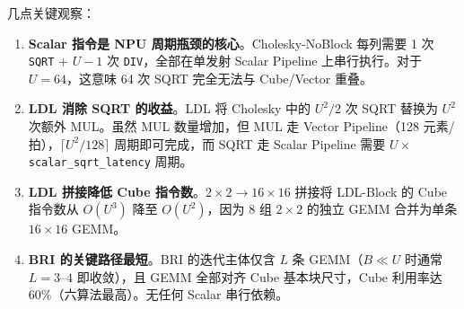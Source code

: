 \documentclass{CjC}
\begin{document}
    几点关键观察：

    \begin{enumerate}
        \item \textbf{Scalar 指令是 NPU 周期瓶颈的核心}。Cholesky-NoBlock 每列需要
            1 次 \texttt{SQRT} + $U-1$ 次 \texttt{DIV}，全部在单发射 Scalar
            Pipeline 上串行执行。对于 $U=64$，这意味 64 次 SQRT 完全无法与 Cube/Vector
            重叠。

        \item \textbf{LDL 消除 SQRT 的收益}。LDL 将 Cholesky 中的 $U^{2}/2$ 次 SQRT
            替换为 $U^{2}$ 次额外 MUL。虽然 MUL 数量增加，但 MUL 走 Vector Pipeline（128
            元素/拍），$\lceil U^{2}/128\rceil$ 周期即可完成，而 SQRT 走 Scalar
            Pipeline 需要 $U\times$\texttt{scalar\_sqrt\_latency} 周期。

        \item \textbf{LDL 拼接降低 Cube 指令数}。$2\times2\rightarrow16\times16$
            拼接将 LDL-Block 的 Cube 指令数从 $O(U^{3})$ 降至 $O(U^{2})$，因为 8
            组 $2\times2$ 的独立 GEMM 合并为单条 $16\times16$ GEMM。

        \item \textbf{BRI 的关键路径最短}。BRI 的迭代主体仅含 $L$ 条 GEMM（$B\ll
            U$
            时通常 $L=3$--$4$ 即收敛），且 GEMM 全部对齐 Cube 基本块尺寸，Cube 利用率达
            60\%（六算法最高）。无任何 Scalar 串行依赖。
    \end{enumerate}
\end{document}
